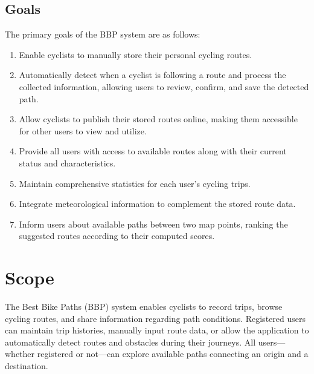 \subsection{Goals}
\label{subsec:goals}%

The primary goals of the BBP system are as follows:

\begin{enumerate}
    \item Enable cyclists to manually store their personal cycling routes.
    \item Automatically detect when a cyclist is following a route and process the collected information, allowing users to review, confirm, and save the detected path.
    \item Allow cyclists to publish their stored routes online, making them accessible for other users to view and utilize.
    \item Provide all users with access to available routes along with their current status and characteristics.
    \item Maintain comprehensive statistics for each user's cycling trips.
    \item Integrate meteorological information to complement the stored route data.
    \item Inform users about available paths between two map points, ranking the suggested routes according to their computed scores.
\end{enumerate}

\section{Scope}
\label{sec:scope}%
The Best Bike Paths (BBP) system enables cyclists to record trips, browse cycling routes, and share information regarding path conditions. Registered users can maintain trip histories, manually input route data, or allow the application to automatically detect routes and obstacles during their journeys. All users—whether registered or not—can explore available paths connecting an origin and a destination.

